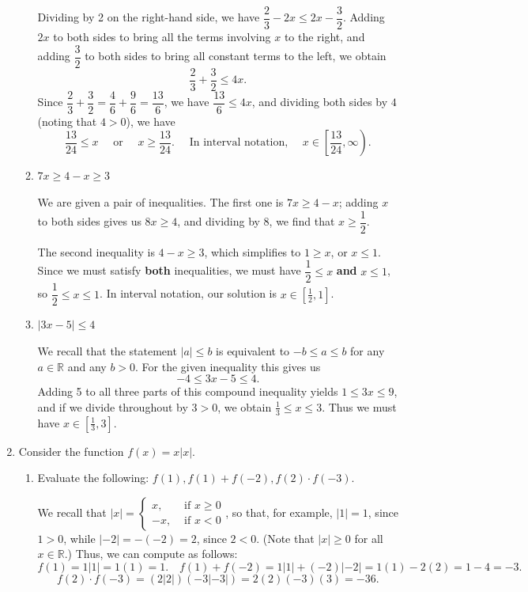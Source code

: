 \documentclass[12pt]{article}
\newcommand{\points}[1]{\marginpar{\hspace{24pt}[#1]}}
\newcommand{\abs}[1]{\lvert #1\rvert}
\begin{document}
\begin{enumerate}
\begin{enumerate}
\bigskip

Dividing by 2 on the right-hand side, we have $\dfrac{2}{3}-2x \leq 2x-\dfrac{3}{2}$. Adding $2x$ to both sides to bring all the terms involving $x$ to the right, and adding $\dfrac{3}{2}$ to both sides to bring all constant terms to the left, we obtain
\[
 \dfrac{2}{3}+\dfrac{3}{2}\leq 4x.
\]
Since $\dfrac{2}{3}+\dfrac{3}{2} = \dfrac{4}{6}+\dfrac{9}{6} = \dfrac{13}{6}$, we have $\dfrac{13}{6}\leq 4x$, and dividing both sides by $4$ (noting that $4>0$), we have
\[
 \frac{13}{24}\leq x \quad \text{ or } \quad x\geq \frac{13}{24}. \quad \text{ In interval notation, } \quad x\in \left[\frac{13}{24},\infty\right).
\]


 \item $7x\geq 4-x\geq 3$ \points{4}

\bigskip

We are given a pair of inequalities. The first one is $7x\geq 4-x$; adding $x$ to both sides gives us $8x\geq 4$, and dividing by 8, we find that $x\geq \dfrac{1}{2}$.

The second inequality is $4-x\geq 3$, which simplifies to $1\geq x$, or $x\leq 1$. Since we must satisfy {\bf both} inequalities, we must have $\dfrac{1}{2}\leq x$ {\bf and} $x\leq 1$, so $\dfrac{1}{2}\leq x\leq 1$. In interval notation, our solution is $x\in [\frac{1}{2},1]$.

\bigskip

 \item $\lvert 3x-5\rvert \leq 4$ \points{3}

\bigskip

We recall that the statement $\lvert a\rvert \leq b$ is equivalent to $-b\leq a\leq b$ for any $a\in \mathbb{R}$ and any $b>0$. For the given inequality this gives us
\[
 -4\leq 3x-5\leq 4.
\]
Adding 5 to all three parts of this compound inequality yields $1\leq 3x\leq 9$, and if we divide throughout by $3>0$, we obtain $\frac{1}{3}\leq x\leq 3$. Thus we must have
$x\in [\frac{1}{3},3].$

\end{enumerate}
\newpage

\item Consider the function $f(x) = x\lvert x\rvert$.
\begin{enumerate}
 \item Evaluate the following: $f(1), f(1) + f(-2), f(2)\cdot f(-3)$. \points{3}

\bigskip

We recall that $\lvert x\rvert = \begin{cases} x, & \text{ if } x\geq 0\\ -x, & \text{ if } x<0\end{cases}$, so that, for example, $\lvert 1\rvert = 1$, since $1>0$, while $\lvert -2\rvert = -(-2) = 2$, since $2<0$. (Note that $\lvert x\rvert \geq 0$ for all $x\in\mathbb{R}$.) Thus, we can compute as follows:
\[
 f(1) = 1\abs{1} = 1(1)=1. \quad f(1)+f(-2) = 1\abs{1}+(-2)\abs{-2} = 1(1)-2(2) = 1-4=-3. 
\]
\[
 f(2)\cdot f(-3) = (2\abs{2})(-3\abs{-3}) = 2(2)(-3)(3) = -36.
\]



\end{enumerate}
\end{enumerate}
\end{document}
